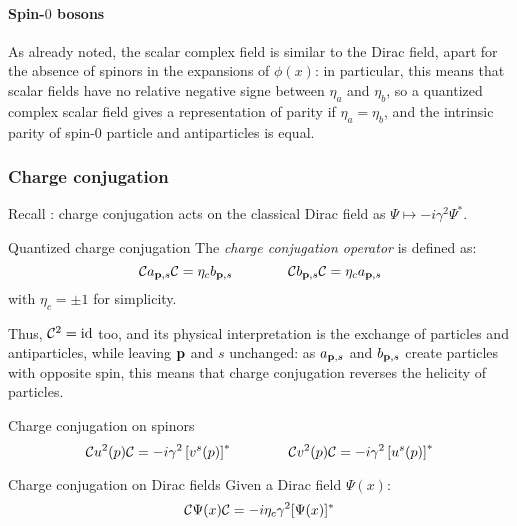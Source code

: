 \paragraph{Spin-$ 0 $ bosons}

As already noted, the scalar complex field is similar to the Dirac field, apart for the absence of spinors in the expansions of $ \phi(x) $: in particular, this means that scalar fields have no relative negative signe between $ \eta_a $ and $ \eta_b $, so a quantized complex scalar field gives a representation of parity if $ \eta_a = \eta_b $, and the intrinsic parity of spin-$ 0 $ particle and antiparticles is equal.

\subsubsection{Charge conjugation}

Recall : charge conjugation acts on the classical Dirac field as $ \Psi \mapsto -i \gamma^2 \Psi^* $.

\begin{definition}{Quantized charge conjugation}{}
  The \textit{charge conjugation operator} is defined as:
  \begin{equation}
    \mathcal{C} a_{\mathbf{p},s} \mathcal{C} = \eta_c b_{\mathbf{p},s}
    \qquad \qquad
    \mathcal{C} b_{\mathbf{p},s} \mathcal{C} = \eta_c a_{\mathbf{p},s}
    \label{eq:charge-conj-op}
  \end{equation}
  with $ \eta_c = \pm 1 $ for simplicity.
\end{definition}

Thus, $ \mathcal{C}^2 = \operatorname{id} $ too, and its physical interpretation is the exchange of particles and antiparticles, while leaving $ \mathbf{p} $ and $ s $ unchanged: as $ a_{\mathbf{p},s} $ and $ b_{\mathbf{p},s} $ create particles with opposite spin, this means that charge conjugation reverses the helicity of particles.

\begin{lemma}[before upper = {\tcbtitle}]{Charge conjugation on spinors}{}
  \begin{equation}
    \mathcal{C} u^2(p) \mathcal{C} = -i \gamma^2 \left[ v^s(p) \right]^*
    \qquad \qquad
    \mathcal{C} v^2(p) \mathcal{C} = -i \gamma^2 \left[ u^s(p) \right]^*
    \label{eq:charge-conj-spin}
  \end{equation}
\end{lemma}

\begin{proposition}{Charge conjugation on Dirac fields}{}
  Given a Dirac field $ \Psi(x) $:
  \begin{equation}
    \mathcal{C} \Psi(x) \mathcal{C} = -i \eta_c \gamma^2 [\Psi(x)]^*
  \end{equation}
\end{proposition}

